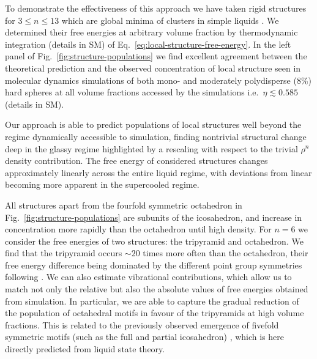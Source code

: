 \documentclass[11pt,twoside]{report}
\begin{document}
To demonstrate the effectiveness of this approach we have taken rigid structures for $3 \le n \le 13$ which are global minima of clusters in simple liquids \cite{Wales2004}.
We determined their free energies at arbitrary volume fraction by thermodynamic integration (details in SM) of Eq.\ \eqref{eq:local-structure-free-energy}.
In the left panel of Fig.\ \ref{fig:structure-populations} we find excellent agreement between the theoretical prediction and the observed concentration of local structure seen in molecular dynamics simulations of both mono- and moderately polydisperse (8\%) hard spheres at all volume fractions accessed by the simulations i.e.\ $\eta \lesssim 0.585$ (details in SM).

Our approach is able to predict populations of local structures well beyond the regime dynamically accessible to simulation, finding nontrivial structural change deep in the glassy regime highlighted by a rescaling with respect to the trivial $\rho^n$ density contribution.
The free energy of considered structures changes approximately linearly across the entire liquid regime, with deviations from linear becoming more apparent in the supercooled regime.

All structures apart from the fourfold symmetric octahedron in Fig.\ \ref{fig:structure-populations} are subunits of the icosahedron, and increase in concentration more rapidly than the octahedron until high density.
For $n=6$ we consider the free energies of two structures: the tripyramid and octahedron.
We find that the tripyramid occurs $\sim20$ times more often than the octahedron, their free energy difference being dominated by the different point group symmetries following \cite{Malins2009,Meng2010}.
We can also estimate vibrational contributions, which allow us to match not only the relative but also the absolute values of free energies obtained from simulation.
In particular, we are able to capture the gradual reduction of the population of octahedral motifs in favour of the tripyramids at high volume fractions.
This is related to the previously observed emergence of fivefold symmetric motifs (such as the full and partial icosahedron) \cite{Royall2015,Tarjus2005,Hallett2018,Dunleavy2015}, which is here directly predicted from liquid state theory.
\end{document}
